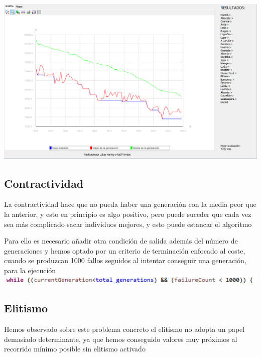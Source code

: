 \documentclass{article}
\begin{document}
\includegraphics[scale=0.4]{./images/rule2.png}

\subsection{Contractividad}
La contractividad hace que no pueda haber una generación con la media peor que la anterior, y esto en principio es algo positivo, pero puede suceder que cada vez sea más complicado sacar individuos mejores, y esto puede estancar el algoritmo\par Para ello es necesario añadir otra condición de salida además del número de generaciones y hemos optado por un criterio de terminación enfocado al coste, cuando se produzcan 1000 fallos seguidos al intentar conseguir una generación, para la ejecución
\\

\includegraphics[scale=0.83]{./images/cont.png}

\subsection{Elitismo}
Hemos observado sobre este problema concreto el elitismo no adopta un papel demasiado determinante, ya que hemos conseguido valores muy próximos al recorrido mínimo posible sin elitismo activado
\end{document}
